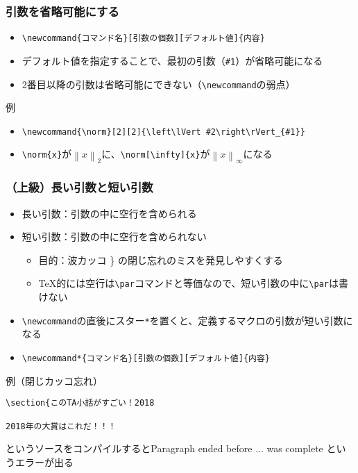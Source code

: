 \documentclass[aspectratio=169]{beamer}
\newcommand\cmdname[1]{\texttt{\textbackslash #1}}
\begin{document}
\begin{frame}[fragile]\frametitle{引数を省略可能にする}
  \begin{itemize}
  \item \lstinline!\newcommand{コマンド名}[引数の個数][デフォルト値]{内容}!
  \item デフォルト値を指定することで、最初の引数（\texttt{\#1}）が省略可能になる
  \item 2番目以降の引数は省略可能にできない（\cmdname{newcommand}の弱点）
  \end{itemize}
  \begin{exampleblock}{例}
    \begin{itemize}
    \item \lstinline!\newcommand{\norm}[2][2]{\left\lVert #2\right\rVert_{#1}}!
      \newcommand{\norm}[2][2]{\left\lVert #2\right\rVert_{#1}}
    \item \lstinline!\norm{x}!が$\norm{x}$に、\lstinline!\norm[\infty]{x}!が$\norm[\infty]{x}$になる
    \end{itemize}
  \end{exampleblock}
\end{frame}
\begin{frame}[fragile]\frametitle{（上級）長い引数と短い引数}
  \begin{itemize}
  \item 長い引数：引数の中に空行を含められる
  \item 短い引数：引数の中に空行を含められない
    \begin{itemize}
    \item 目的：波カッコ \} の閉じ忘れのミスを発見しやすくする
    \item \TeX 的には空行は\cmdname{par}コマンドと等価なので、短い引数の中に\cmdname{par}は書けない
    \end{itemize}
  \item \cmdname{newcommand}の直後にスター\texttt{*}を置くと、定義するマクロの引数が短い引数になる
  \item \lstinline!\newcommand*{コマンド名}[引数の個数][デフォルト値]{内容}!
  \end{itemize}
  \begin{exampleblock}{例（閉じカッコ忘れ）}
\begin{lstlisting}[frame=single]
\section{このTA小話がすごい！2018

2018年の大賞はこれだ！！！
\end{lstlisting}
というソースをコンパイルするとParagraph ended before ... was complete というエラーが出る
  \end{exampleblock}
\end{frame}
\end{document}
